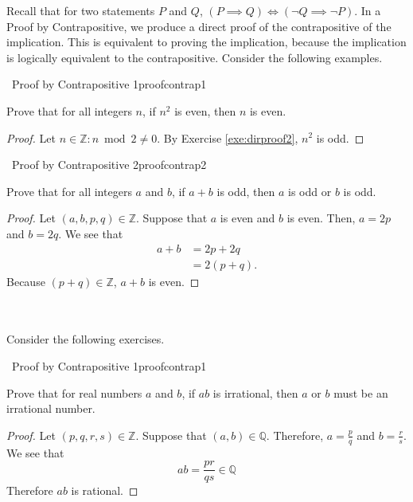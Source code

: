     Recall that for two statements \(P\) and \(Q\), \((P\implies Q)\iff(\neg Q\implies \neg P)\). In a Proof by Contrapositive, we produce a direct proof of the contrapositive of the implication. This is equivalent to proving the implication, because the implication is logically equivalent to the contrapositive. Consider the following examples.
    \begin{example}{\Difficulty\,\Difficulty\,\,Proof by Contrapositive 1}{proofcontrap1}
    
    Prove that for all integers \(n\), if \(n^2\) is even, then \(n\) is even.
    
    \begin{proof}
        Let \(n\in\mathbb{Z}:n\bmod2\neq0\). By Exercise \ref{exe:dirproof2}, \(n^2\) is odd.
    \end{proof}
    
    \end{example}
    \begin{example}{\Difficulty\,\Difficulty\,\,Proof by Contrapositive 2}{proofcontrap2}
    
    Prove that for all integers \(a\) and \(b\), if \(a+b\) is odd, then \(a\) is odd or \(b\) is odd.
    
    \begin{proof}
        Let \((a, b,p,q)\in\mathbb{Z}\). Suppose that \(a\) is even and \(b\) is even. Then, \(a=2p\) and \(b=2q\). We see that
        \begin{align*}
            a+b&=2p+2q \\
            &=2(p+q).
        \end{align*}
        Because \((p+q)\in\mathbb{Z}\), \(a+b\) is even.
    \end{proof}
    
    \end{example}
    \vphantom
    \\
    \\
    Consider the following exercises.
    \begin{exercise}{\Difficulty\,\Difficulty\,\,Proof by Contrapositive 1}{proofcontrap1}
    
    Prove that for real numbers \(a\) and \(b\), if \(ab\) is irrational, then \(a\) or \(b\) must be an irrational number.
    
    \begin{proof}
        Let \((p,q,r,s)\in\mathbb{Z}\). Suppose that \((a,b)\in\mathbb{Q}\). Therefore, \(a=\frac{p}{q}\) and \(b=\frac{r}{s}\). We see that
        \begin{equation*}
            ab=\frac{pr}{qs}\in\mathbb{Q}
        \end{equation*}
        Therefore \(ab\) is rational.
    \end{proof}
    
    \end{exercise}
